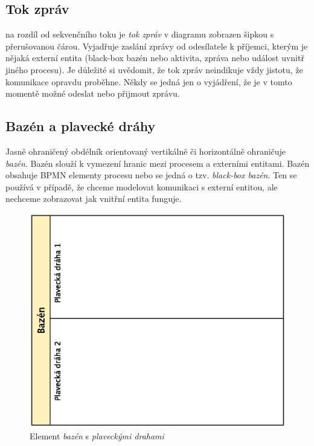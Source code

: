 \subsection{Tok zpráv}
na rozdíl od sekvenčního toku je \textit{tok zpráv} v diagramu zobrazen šipkou s přerušovanou čárou. Vyjadřuje zaslání zprávy od odesílatele k příjemci, kterým je nějaká externí entita (black-box bazén nebo aktivita, zpráva nebo událost uvnitř jiného procesu). Je důležité si uvědomit, že tok zpráv neindikuje vždy jistotu, že komunikace opravdu proběhne. Někdy se jedná jen o vyjádření, že je v tomto momentě možné odeslat nebo přijmout zprávu.

\subsection{Bazén a plavecké dráhy}
Jasně ohraničený obdélník orientovaný vertikálně či horizontálně ohraničuje \textit{bazén}. Bazén slouží k vymezení hranic mezi procesem a externími entitami. Bazén obsahuje BPMN elementy procesu nebo se jedná o tzv.\textit{ black-box bazén}. Ten se používá v případě, že chceme modelovat komunikaci s externí entitou, ale nechceme zobrazovat jak vnitřní entita funguje.

\begin{figure}[H]\centering
\includegraphics[scale=0.7]{obrazky/pool-swimming_lane}
\caption{Element \textit{bazén} s \textit{plaveckými drahami}}
\label{fig:bazen}
\end{figure}


